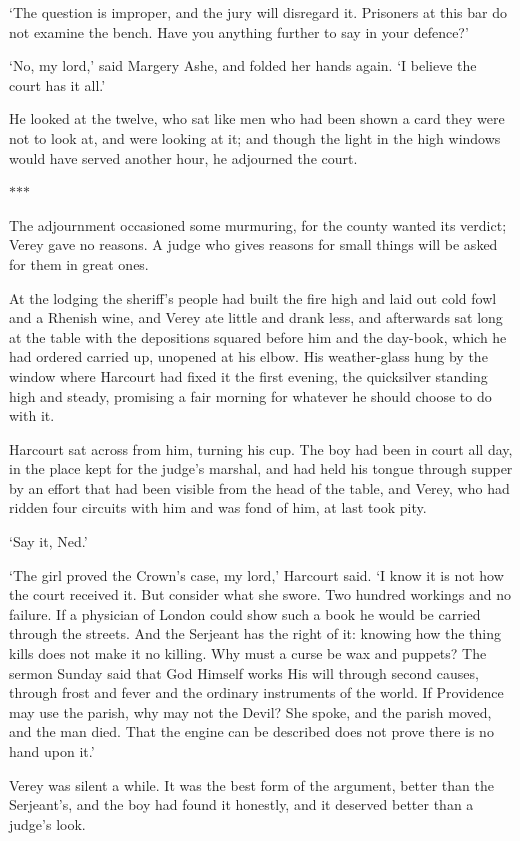 \documentclass[11pt]{article}
\newcommand{\scenebreak}{%
  \par\vspace{1.1\baselineskip}%
  {\centering $\ast$\quad$\ast$\quad$\ast$\par}%
  \vspace{1.1\baselineskip}\noindent}
\begin{document}
`The question is improper, and the jury will disregard it. Prisoners at this bar do not examine the bench. Have you anything further to say in your defence?'

`No, my lord,' said Margery Ashe, and folded her hands again. `I believe the court has it all.'

He looked at the twelve, who sat like men who had been shown a card they were not to look at, and were looking at it; and though the light in the high windows would have served another hour, he adjourned the court.

\scenebreak
\noindent The adjournment occasioned some murmuring, for the county wanted its verdict; Verey gave no reasons. A judge who gives reasons for small things will be asked for them in great ones.

At the lodging the sheriff's people had built the fire high and laid out cold fowl and a Rhenish wine, and Verey ate little and drank less, and afterwards sat long at the table with the depositions squared before him and the day-book, which he had ordered carried up, unopened at his elbow. His weather-glass hung by the window where Harcourt had fixed it the first evening, the quicksilver standing high and steady, promising a fair morning for whatever he should choose to do with it.

Harcourt sat across from him, turning his cup. The boy had been in court all day, in the place kept for the judge's marshal, and had held his tongue through supper by an effort that had been visible from the head of the table, and Verey, who had ridden four circuits with him and was fond of him, at last took pity.

`Say it, Ned.'

`The girl proved the Crown's case, my lord,' Harcourt said. `I know it is not how the court received it. But consider what she swore. Two hundred workings and no failure. If a physician of London could show such a book he would be carried through the streets. And the Serjeant has the right of it: knowing how the thing kills does not make it no killing. Why must a curse be wax and puppets? The sermon Sunday said that God Himself works His will through second causes, through frost and fever and the ordinary instruments of the world. If Providence may use the parish, why may not the Devil? She spoke, and the parish moved, and the man died. That the engine can be described does not prove there is no hand upon it.'

Verey was silent a while. It was the best form of the argument, better than the Serjeant's, and the boy had found it honestly, and it deserved better than a judge's look.
\end{document}
